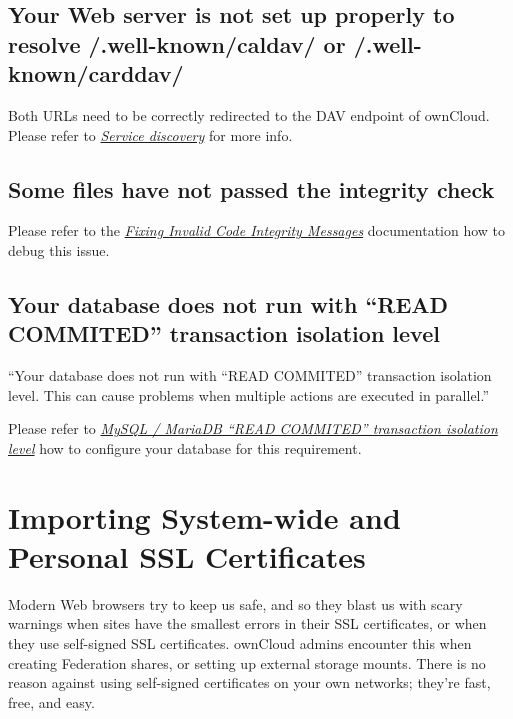 \documentclass[letterpaper,10pt,english]{sphinxmanual}
\begin{document}
\subsection{Your Web server is not set up properly to resolve /.well-known/caldav/ or /.well-known/carddav/}
\label{configuration_server/security_setup_warnings:your-web-server-is-not-set-up-properly-to-resolve-well-known-caldav-or-well-known-carddav}
Both URLs need to be correctly redirected to the DAV endpoint of ownCloud. Please
refer to {\hyperref[issues/general_troubleshooting:service-discovery-label]{\emph{Service discovery}}} for more info.


\subsection{Some files have not passed the integrity check}
\label{configuration_server/security_setup_warnings:some-files-have-not-passed-the-integrity-check}
Please refer to the {\hyperref[issues/code_signing:code-signing-fix-warning-label]{\emph{Fixing Invalid Code Integrity Messages}}} documentation how to debug this issue.


\subsection{Your database does not run with ``READ COMMITED'' transaction isolation level}
\label{configuration_server/security_setup_warnings:your-database-does-not-run-with-read-commited-transaction-isolation-level}
``Your database does not run with ``READ COMMITED'' transaction isolation level.
This can cause problems when multiple actions are executed in parallel.''

Please refer to {\hyperref[configuration_database/linux_database_configuration:db-transaction-label]{\emph{MySQL / MariaDB ``READ COMMITED'' transaction isolation level}}} how to configure your database for this requirement.


\section{Importing System-wide and Personal SSL Certificates}
\label{configuration_server/import_ssl_cert:importing-system-wide-and-personal-ssl-certificates}\label{configuration_server/import_ssl_cert::doc}
Modern Web browsers try to keep us safe, and so they blast us with scary warnings when sites have the smallest errors in their SSL certificates, or when they use self-signed SSL certificates. ownCloud admins encounter this when creating Federation shares, or setting up external storage mounts. There is no reason against using self-signed certificates on your own networks; they're fast, free, and easy.
\end{document}
